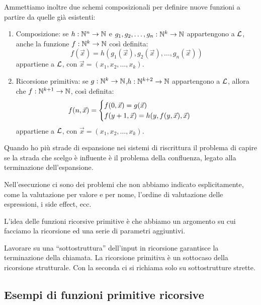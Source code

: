 Ammettiamo inoltre due schemi composizionali per definire nuove funzioni a partire da quelle già
esistenti:
\begin{enumerate}
    \item Composizione: se $h : \mathbb{N}^{n} \to \mathbb{N}$ e $g_{1},g_{2},\dotsc,g_{n}:\mathbb{N}^{k} \to \mathbb{N}$
    appartengono a $\mathcal{L}$, anche la funzione $f: \mathbb{N}^{k} \to \mathbb{N}$ così definita:
    \begin{equation*}
        f(\vec{x}) = h(g_{1}(\vec{x}),g_{2}(\vec{x}),\dotsc,g_{n}(\vec{x}))
    \end{equation*}
    appartiene a $\mathcal{L}$, con $\vec{x} = (x_{1},x_{2},\dotsc,x_{k})$.
    \item Ricorsione primitiva: se $g: \mathbb{N}^{k} \to \mathbb{N}$,$h: \mathbb{N}^{k+2}\to \mathbb{N}$ appartengono a
    $\mathcal{L}$, allora che $f: \mathbb{N}^{k+1} \to \mathbb{N}$, così definita:
    \begin{equation*}
        f(n,\vec{x}) =
        \begin{cases}
            f(0,\vec{x}) = g(\vec{x}) \quad &\text{}\\
            f(y+1,\vec{x}) = h(y,f(y,\vec{x}),\vec{x}) \quad &\text{}\\
        \end{cases}
    \end{equation*}
    appartiene a $\mathcal{L}$, con $\vec{x} = (x_{1},x_{2},\dotsc,x_{k})$.
\end{enumerate}

Quando ho più strade di espansione nei sistemi di riscrittura il problema di capire se la strada
che scelgo è influente è il problema della confluenza, legato alla terminazione dell'espansione.

Nell'esecuzione ci sono dei problemi che non abbiamo indicato esplicitamente, come la valutazione
per valore e per nome, l'ordine di valutazione delle espressioni, i side effect, ecc.


L'idea delle funzioni ricorsive primitive è che abbiamo un argomento su cui facciamo la ricorsione
ed una serie di parametri aggiuntivi.

Lavorare su una ``sottostruttura'' dell'input in ricorsione garantisce la terminazione della chiamata.
La ricorsione primitiva è un sottocaso della ricorsione strutturale. Con la seconda ci si richiama
solo su sottostrutture strette.

\subsection{Esempi di funzioni primitive ricorsive}


